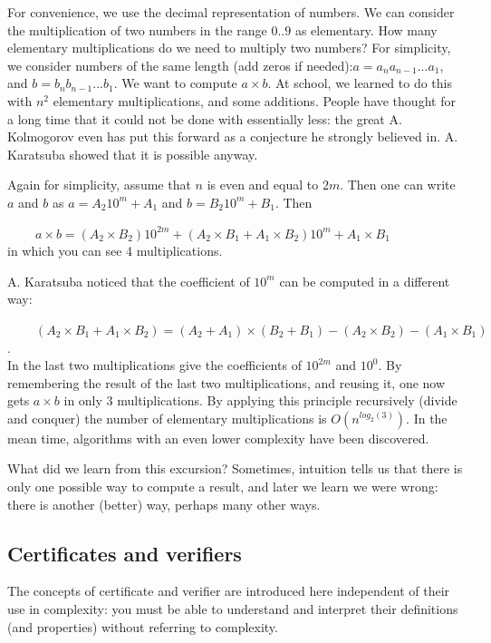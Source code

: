 For convenience, we use the decimal representation of numbers.
We can consider the multiplication of two numbers in the range $0..9$
as elementary. How many elementary multiplications do we need to
multiply two numbers? For simplicity, we consider numbers of the same
length (add zeros if needed):$a= a_na_{n-1}...a_1$, and
$b = b_nb_{n-1}...b_1$. We want to compute $a \times b$. At school, we
learned to do this with $n^2$ elementary multiplications, and some
additions. People have thought for a long time that it could not be
done with essentially less: the great A. Kolmogorov even has put this
forward as a conjecture he strongly believed in. A. Karatsuba showed
that it is possible anyway.

Again for simplicity, assume that $n$ is even and equal to $2m$. Then
one can write $a$ and $b$ as
%
$a = A_{2}10^m + A_1$ and $b = B_{2}10^m + B_1$.
%
Then

$~~~~~~~~~~a \times b = (A_{2}\times B_{2})10^{2m} + (A_{2}\times B_1 + A_1\times B_{2})10^m + A_1\times B_1 $ \\
in which you can see 4 multiplications.

A. Karatsuba noticed that the coefficient of $10^m$ can be computed in
a different way:

$~~~~~~~~~~(A_{2}\times B_1 + A_1\times B_{2}) = (A_{2} + A_1) \times (B_{2} +
B_1) - (A_{2}\times B_{2}) - (A_1\times B_1)$. \\
In the last two multiplications give the coefficients of $10^{2m}$ and
$10^0$. By remembering the result of the last two multiplications, and
reusing it, one now gets $a \times b$ in only 3 multiplications.
By applying this principle recursively (divide and conquer) the number
of elementary multiplications is $O(n^{log_2(3)})$. In the mean time,
algorithms with an even lower complexity have been discovered.

What did we learn from this excursion? Sometimes, intuition tells us
that there is only one possible way to compute a result, and later we
learn we were wrong: there is another (better) way, perhaps many other
ways.

\subsection{Certificates and verifiers}

The concepts of certificate and verifier are introduced here
independent of their use in complexity: you must be able to understand
and interpret their definitions (and properties) without referring to
complexity.

